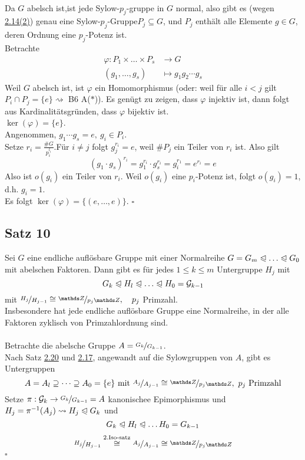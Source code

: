 \\
Da $G$ abelsch ist,ist jede Sylow-$p_j$-gruppe in $G$ normal, also gibt es (wegen \hyperref[sub:def_sylow_gruppe]{2.14(2)}) genau eine Sylow-$p_j$-Gruppe$P_j\subseteq G$, und $P_j$ enthält alle Elemente $g\in G$, deren Ordnung eine $p_j$-Potenz ist.\\
Betrachte
\begin{equation*}
\begin{aligned}
	\varphi:P_1\times\dots\times P_s&\to G\\
	(g_1,\dots,g_s)&\mapsto g_1g_2\cdots g_s
\end{aligned}
\end{equation*}
Weil $G$ abelsch ist, ist $\varphi$ ein Homomorphismus (oder: weil für alle $i<j$ gilt $P_i\cap P_j=\{e\}\rightsquigarrow$ B6 A($\ast$)). Es genügt zu zeigen, dass $\varphi$ injektiv ist, dann folgt aus Kardinalitätsgründen, dass $\varphi$ bijektiv ist.\\
\zz  $\ker(\varphi)=\{e\}$.\\
Angenommen, $g_1\cdots g_s=e,~ g_i\in P_i$.\\
Setze $r_i=\frac{\#G}{p_i^{l_i}}$.Für $i\neq j$ folgt $g_j^{r_i}=e$, weil $\#P_j$ ein Teiler von $r_i$ ist. Also gilt \[ (g_1\cdot g_s)^{r_i}=g_1^{r_i}\cdot g_s^{r_i}=g_i^{r_1}=e^{r_i}=e \]
Also ist $o(g_i)$ ein Teiler von $r_i$. Weil $o(g_i)$ eine $p_i$-Potenz ist, folgt $o(g_i)=1$, d.h. $g_i=1$.\\
Es folgt $\ker(\varphi)=\{(e,\dots,e)\}$.
\hfill $\square$

\subsection{Satz 10}
\label{sub:satz_10}
Sei $G$ eine endliche auflösbare Gruppe mit einer Normalreihe $G=G_m\nt\dots\nt G_0$ mit abelschen Faktoren. Dann gibt es für jedes $1\le k\le m$ Untergruppe $H_j$ mit
\[
G_k\nt H_l\nt\dots\nt H_0=\G_{k-1}
\]
mit $\nicefrac{H_j}{H_{j-1}}\cong \nicefrac{\Z}{p_j\Z},\quad p_j$ Primzahl.\\
Insbesondere hat jede endliche auflösbare Gruppe eine Normalreihe, in der alle Faktoren zyklisch von Primzahlordnung sind.\\

\\
Betrachte die abelsche Gruppe $A=\nicefrac{G_k}{G_{k-1}}$.\\
Nach Satz \hyperref[sub:satz_9]{2.20} und \hyperref[sub:lemma_4]{2.17}, angewandt auf die Sylowgruppen von $A$, gibt es Untergruppen
\[
A=A_l\supseteq \dots\supseteq A_0=\{e\}\text{ mit } \nicefrac{A_j}{A_{j-1}}\cong\nicefrac{\Z}{p_j\Z},~p_j\text{ Primzahl}
\] 
Setze $\pi:\mathcal{G}_k\to\nicefrac{G_k}{G_{k-1}}=A$ kanonischee Epimorphismus und $H_j=\pi^{-1}(A_j)\rightsquigarrow H_j\trianglelefteqslant G_k$ und
\[
G_k\trianglelefteqslant H_l\trianglelefteqslant \dots H_0=G_{k-1}
\]
\[
\nicefrac{H_j}{H_{j-1}}\stackrel{\text{2.Iso-satz}}{\cong} \nicefrac{A_j}{A_{j-1}} \cong \nicefrac{\Z}{p_j\Z}
\]
\hfill $\square$

